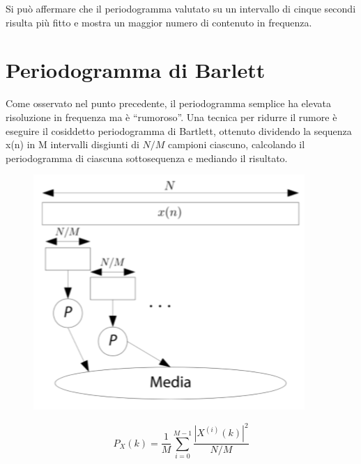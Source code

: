 Si può aﬀermare che il periodogramma valutato su un intervallo di cinque 
secondi risulta più ﬁtto e mostra un maggior numero di contenuto 
in frequenza.


\section{Periodogramma di Barlett}
Come osservato nel punto precedente, il periodogramma semplice ha elevata 
risoluzione in frequenza ma è “rumoroso”. Una tecnica per ridurre il rumore è 
eseguire il cosiddetto periodogramma di Bartlett, ottenuto dividendo la 
sequenza x(n) in M intervalli disgiunti di $N/M$ campioni 
ciascuno, calcolando il periodogramma di ciascuna sottosequenza e 
mediando il risultato.
\begin{minipage}[t]{.35\textwidth}
	\begin{figure}[H]
		\includegraphics[width=\textwidth]{./images/cap4/barlett.png}
	\end{figure}
\end{minipage}
\hfill
\begin{minipage}[t]{.55\textwidth}
	\vspace*{2cm}
	\begin{equation*}
		P_X(k) = \frac{1}{M} \sum^{M-1}_{i=0} \frac{|X^{(i)}(k)|^2}{N/M}
	\end{equation*}
\end{minipage}


